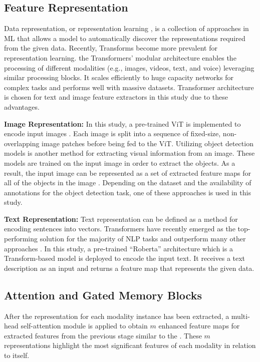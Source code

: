 \documentclass{midl}
\begin{document}
\subsection{Feature Representation}
\label{feature}
Data representation, or representation learning \cite{bengio2013representation}, is a collection of approaches in ML that allows a model to automatically discover the representations required from the given data. Recently, Transforms become more prevalent for representation learning. the Transformers' modular architecture enables the processing of different modalities (e.g., images, videos, text, and voice) leveraging similar processing blocks. It scales efficiently to huge capacity networks for complex tasks and performs well with massive datasets. Transformer architecture is chosen for text and image feature extractors in this study due to these advantages.

\textbf{Image Representation:} 
\label{image}
In this study, a pre-trained ViT \cite{dosovitskiy2020image} is implemented to encode input images . Each image is split into a sequence of fixed-size, non-overlapping image patches before being fed to the ViT.
Utilizing object detection models is another method for extracting visual information from an image. These models are trained on the input image in order to extract the objects. As a result, the input image can be represented as a set of extracted feature maps for all of the objects in the image \cite{lee2018stacked,chen2020imram}.
Depending on the dataset and the availability of annotations for the object detection task, one of these approaches is used in this study.

\textbf{Text Representation:}
Text representation can be defined as a method for encoding sentences into vectors. Transformers have recently emerged as the top-performing solution for the majority of NLP tasks and outperform many other approaches \cite{liu2019roberta,radford2019language, UsingDee40:online}.
In this study, a pre-trained ``Roberta'' architecture  \cite{liu2019roberta} which is a Transform-based model is deployed to encode the input text. It receives a text description as an input and returns a feature map that represents the given data. 

\subsection{Attention and Gated Memory Blocks}\label{memory_sec}
After the representation for each modality instance has been extracted, a multi-head self-attention module is applied to obtain $m$ enhanced feature maps for extracted features from the previous stage similar to the \cite{wei2020multi}. These $m$ representations highlight the most significant features of each modality in relation to itself. 
\end{document}
